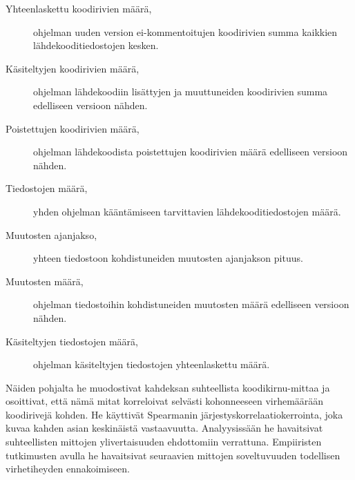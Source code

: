 \documentclass[finnish]{../tktltiki2}
\theoremstyle{definition}
\theoremstyle{remark}
\begin{document}
\begin{description}
    
    \item[Yhteenlaskettu koodirivien määrä,] ohjelman uuden version ei-kommen\-toitujen koodirivien summa kaikkien 
                                             lähdekooditiedostojen kesken.
    
    \item[Käsiteltyjen koodirivien määrä,] ohjelman lähdekoodiin lisättyjen ja muuttuneiden koodirivien summa 
                                           edelliseen versioon nähden.
    
    \item[Poistettujen koodirivien määrä,] ohjelman lähdekoodista poistettujen koodirivien määrä edelliseen versioon 
                                           nähden.
    
    \item[Tiedostojen määrä,] yhden ohjelman kääntämiseen tarvittavien lähdekoodi\-tiedostojen määrä.
    
    \item[Muutosten ajanjakso,] yhteen tiedostoon kohdistuneiden muutosten ajanjakson pituus.
    
    \item[Muutosten määrä,] ohjelman tiedostoihin kohdistuneiden muutosten määrä edelliseen versioon nähden.
    
    \item[Käsiteltyjen tiedostojen määrä,] ohjelman käsiteltyjen tiedostojen yhteenlaskettu määrä.

\end{description}

    Näiden pohjalta he muodostivat kahdeksan suhteellista koodikirnu-mittaa ja osoittivat, että nämä mitat korreloivat 
selvästi kohonneeseen virhemäärään koodirivejä kohden. He käyttivät Spearmanin järjestyskorrelaatiokerrointa, joka kuvaa 
kahden asian keskinäistä vastaavuutta. Analyysissään he havaitsivat suhteellisten mittojen ylivertaisuuden ehdottomiin 
verrattuna. Empiiristen tutkimusten avulla he havaitsivat seuraavien mittojen soveltuvuuden todellisen virhetiheyden 
ennakoimiseen.
\end{document}
